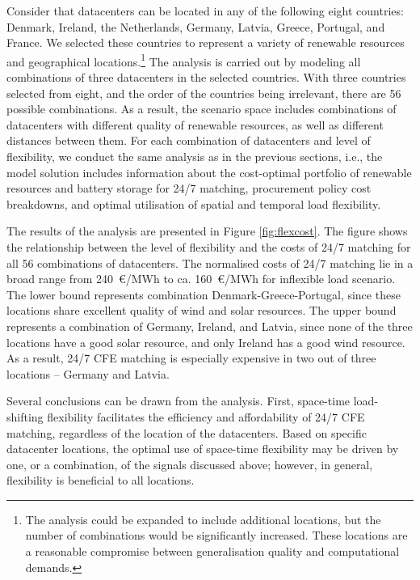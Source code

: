 Consider that datacenters can be located in any of the following eight countries: Denmark, Ireland, the Netherlands, Germany, Latvia, Greece, Portugal, and France. We selected these countries to represent a variety of renewable resources and geographical locations.\footnote{The analysis could be expanded to include additional locations, but the number of combinations would be significantly increased. These locations are a reasonable compromise between generalisation quality and computational demands.} The analysis is carried out by modeling all combinations of three datacenters in the selected countries. With three countries selected from eight, and the order of the countries being irrelevant, there are 56 possible combinations. As a result, the scenario space includes combinations of datacenters with different quality of renewable resources, as well as different distances between them.
For each combination of datacenters and level of flexibility, we conduct the same analysis as in the previous sections, i.e., the model solution includes information about the cost-optimal portfolio of renewable resources and battery storage for 24/7 matching, procurement policy cost breakdowns, and optimal utilisation of spatial and temporal load flexibility.

The results of the analysis are presented in Figure \ref{fig:flexcost}. The figure shows the relationship between the level of flexibility and the costs of 24/7 matching for all 56 combinations of datacenters. The normalised costs of 24/7 matching lie in a broad range from 240~\euro/MWh to ca. 160~\euro/MWh for inflexible load scenario. The lower bound represents combination Denmark-Greece-Portugal, since these locations share excellent quality of wind and solar resources. The upper bound represents a combination of Germany, Ireland, and Latvia, since none of the three locations have a good solar resource, and only Ireland has a good wind resource.  As a result, 24/7 CFE matching is especially expensive in two out of three locations -- Germany and Latvia.

Several conclusions can be drawn from the analysis. First, space-time load-shifting flexibility facilitates the efficiency and affordability of 24/7 CFE matching, regardless of the location of the datacenters. Based on specific datacenter locations, the optimal use of space-time flexibility may be driven by one, or a combination, of the signals discussed above; however, in general, flexibility is beneficial to all locations.

